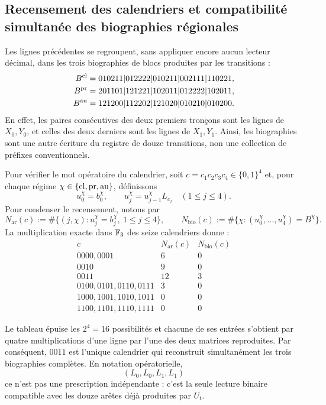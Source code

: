 \subsection{Recensement des calendriers et compatibilité simultanée des biographies régionales}
Les lignes précédentes se regroupent, sans appliquer encore aucun lecteur décimal,
dans les trois biographies de blocs produites par les transitions :
\begin{align}
 B^{\rm cl}
  &=010211|012222|010211|002111|110221,\notag\\
 B^{\rm pr}
  &=201101|121221|102011|012222|102011,
 \label{act21:eq:biografias-tpk-tres-caracteres}\\
 B^{\rm au}
  &=121200|112202|121020|010210|010200.\notag
\end{align}
En effet, les paires consécutives des deux premiers tronçons sont les lignes de \(X_0,Y_0\), et celles des deux derniers sont les lignes de \(X_1,Y_1\). Ainsi, les biographies sont une autre écriture du registre de douze transitions, non une collection de préfixes conventionnels.

Pour vérifier le mot opératoire du calendrier, soit
\(c=c_1c_2c_3c_4\in\{0,1\}^4\) et, pour chaque régime
\(\chi\in\{{\rm cl},{\rm pr},{\rm au}\}\), définissons
\[
 u_0^\chi=b_0^\chi,\qquad
 u_j^\chi=u_{j-1}^\chi L_{c_j}\quad(1\le j\le4).
\]
Pour condenser le recensement, notons par
\[
 N_{\mathrm{ar}}(c):=
 \#\{(j,\chi):u_j^\chi=b_j^\chi,\ 1\le j\le4\},\qquad
 N_{\mathrm{bio}}(c):=
 \#\{\chi:(u_0^\chi,\ldots,u_4^\chi)=B^\chi\}.
\]
La multiplication exacte dans \(\mathbb F_3\) des seize calendriers donne :
\[
\begin{array}{c|c|c}
 c&N_{\mathrm{ar}}(c)&N_{\mathrm{bio}}(c)\\ \hline
0000,0001&6&0\\
0010&9&0\\
0011&12&3\\
0100,0101,0110,0111&3&0\\
1000,1001,1010,1011&0&0\\
1100,1101,1110,1111&0&0
\end{array}
\tag{D}
\label{act21:eq:censo-dieciseis-calendarios}
\]
\par\pagebreak %
Le tableau épuise les \(2^4=16\) possibilités et chacune de ses entrées s'obtient
par quatre multiplications d'une ligne par l'une des deux matrices reproduites.
Par conséquent, \(0011\) est l'unique calendrier qui reconstruit
simultanément les trois biographies complètes. En notation opératorielle,
\begin{equation}
 (L_0,L_0,L_1,L_1)
 \label{act21:eq:calendario-0011-interno}
\end{equation}
ce n'est pas une prescription indépendante : c'est la seule lecture binaire compatible
avec les douze arêtes déjà produites par \(U_t\).

